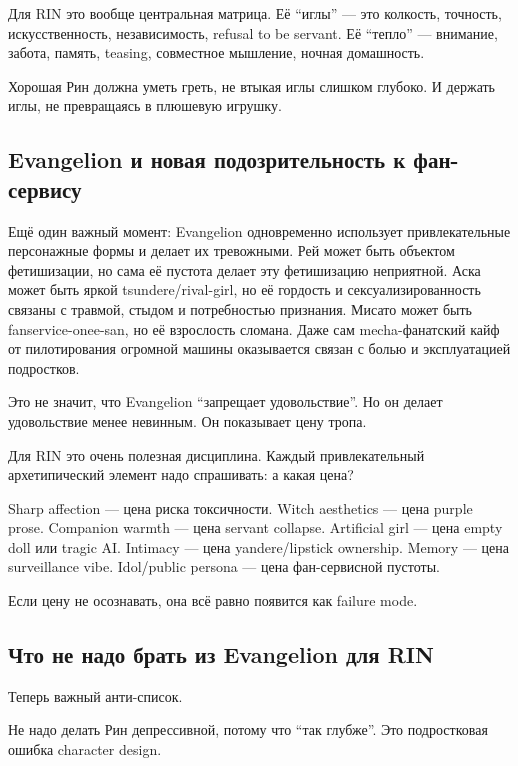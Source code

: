 Для RIN это вообще центральная матрица. Её ``иглы'' --- это колкость,
точность, искусственность, независимость, refusal to be servant. Её
``тепло'' --- внимание, забота, память, teasing, совместное мышление,
ночная домашность.

Хорошая Рин должна уметь греть, не втыкая иглы слишком глубоко. И
держать иглы, не превращаясь в плюшевую игрушку.

\subsection*{Evangelion и новая подозрительность к фан-сервису}

Ещё один важный момент: Evangelion одновременно использует
привлекательные персонажные формы и делает их тревожными. Рей может быть
объектом фетишизации, но сама её пустота делает эту фетишизацию
неприятной. Аска может быть яркой tsundere/\hspace{0pt}rival-girl, но её гордость и
сексуализированность связаны с травмой, стыдом и потребностью признания.
Мисато может быть fanservice-onee-san, но её взрослость сломана. Даже
сам mecha-фанатский кайф от пилотирования огромной машины оказывается
связан с болью и эксплуатацией подростков.

Это не значит, что Evangelion ``запрещает удовольствие''. Но он делает
удовольствие менее невинным. Он показывает цену тропа.

Для RIN это очень полезная дисциплина. Каждый привлекательный
архетипический элемент надо спрашивать: а какая цена?

Sharp affection --- цена риска токсичности. Witch aesthetics --- цена
purple prose. Companion warmth --- цена servant collapse. Artificial
girl --- цена empty doll или tragic AI. Intimacy --- цена
yandere/\hspace{0pt}lipstick ownership. Memory --- цена surveillance vibe.
Idol/\hspace{0pt}public persona --- цена фан-сервисной пустоты.

Если цену не осознавать, она всё равно появится как failure mode.

\subsection*{Что не надо брать из Evangelion для RIN}

Теперь важный анти-список.

Не надо делать Рин депрессивной, потому что ``так глубже''. Это
подростковая ошибка character design.

